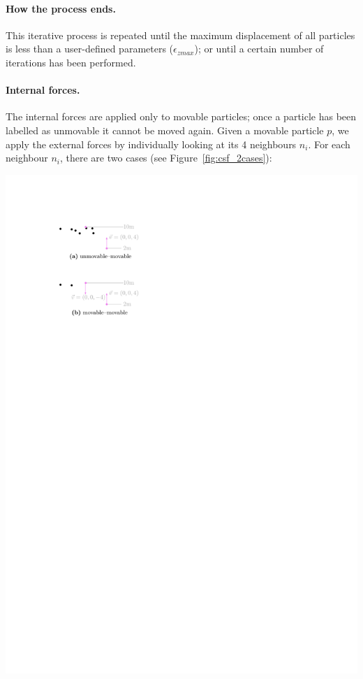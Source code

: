 %

\paragraph{How the process ends.}
This iterative process is repeated until the maximum displacement of all particles is less than a user-defined parameters ($\epsilon_{zmax}$); or until a certain number of iterations has been performed.

%

\paragraph{Internal forces.}
The internal forces are applied only to movable particles; once a particle has been labelled as unmovable it cannot be moved again.
Given a movable particle $p$, we apply the external forces by individually looking at its 4 neighbours $n_i$.
For each neighbour $n_i$, there are two cases (see Figure~\ref{fig:csf_2cases}):
\begin{marginfigure}
  \centering
  \includegraphics[width=\linewidth]{figs/csf_2cases}
  \caption{}%
\label{fig:csf_2cases}
\end{marginfigure}

